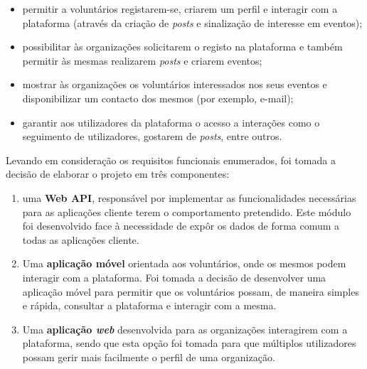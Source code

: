 \begin{itemize}
	\item permitir a voluntários registarem-se, criarem um perfil e interagir com a plataforma (através da criação de \textit{posts} e sinalização de interesse em eventos);
	\item possibilitar às organizações solicitarem o registo na plataforma e também permitir às mesmas realizarem \textit{posts} e criarem eventos;
	\item mostrar às organizações os voluntários interessados nos seus eventos e disponibilizar um contacto dos mesmos (por exemplo, e-mail);
	\item garantir aos utilizadores da plataforma o acesso a interações como o seguimento de utilizadores, gostarem de \textit{posts}, entre outros.
\end{itemize}

Levando em consideração os requisitos funcionais enumerados, foi tomada a decisão de elaborar o projeto em três componentes: 
\begin{enumerate}
	\item uma \textbf{Web API}, responsável por implementar as funcionalidades necessárias para as aplicações cliente terem o comportamento pretendido. Este módulo foi desenvolvido face à necessidade de expôr os dados de forma comum a todas as aplicações cliente.
	\item Uma \textbf{aplicação móvel} orientada aos voluntários, onde os mesmos podem interagir com a plataforma. Foi tomada a decisão de desenvolver uma aplicação móvel para permitir que os voluntários possam, de maneira simples e rápida, consultar a plataforma e interagir com a mesma.
	\item Uma \textbf{aplicação \textit{web}} desenvolvida para as organizações interagirem com a plataforma, sendo que esta opção foi tomada para que múltiplos utilizadores possam gerir mais facilmente o perfil de uma organização.
\end{enumerate}